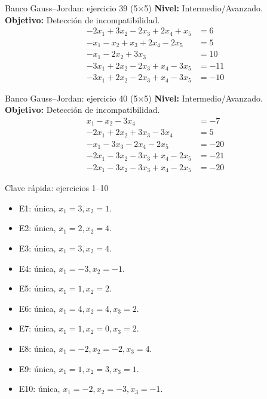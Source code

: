 \documentclass[aspectratio=169,9pt]{beamer}
\theoremstyle{remark}
\begin{document}
\begin{frame}[t]{Banco Gauss--Jordan: ejercicio 39 (5$\times$5)}
\textbf{Nivel:} Intermedio/Avanzado.\\
\textbf{Objetivo:} Detección de incompatibilidad.
\[
\begin{aligned}
- 2 x_{1} + 3 x_{2} - 2 x_{3} + 2 x_{4} + x_{5} &= 6\\
- x_{1} - x_{2} + x_{3} + 2 x_{4} - 2 x_{5} &= 5\\
- x_{1} - 2 x_{2} + 3 x_{3} &= 10\\
- 3 x_{1} + 2 x_{2} - 2 x_{3} + x_{4} - 3 x_{5} &= -11\\
- 3 x_{1} + 2 x_{2} - 2 x_{3} + x_{4} - 3 x_{5} &= -10
\end{aligned}
\]
\end{frame}
\begin{frame}[t]{Banco Gauss--Jordan: ejercicio 40 (5$\times$5)}
\textbf{Nivel:} Intermedio/Avanzado.\\
\textbf{Objetivo:} Detección de incompatibilidad.
\[
\begin{aligned}
x_{1} - x_{2} - 3 x_{4} &= -7\\
- 2 x_{1} + 2 x_{2} + 3 x_{3} - 3 x_{4} &= 5\\
- x_{1} - 3 x_{3} - 2 x_{4} - 2 x_{5} &= -20\\
- 2 x_{1} - 3 x_{2} - 3 x_{3} + x_{4} - 2 x_{5} &= -21\\
- 2 x_{1} - 3 x_{2} - 3 x_{3} + x_{4} - 2 x_{5} &= -20
\end{aligned}
\]
\end{frame}
\begin{frame}[t]{Clave rápida: ejercicios 1--10}\begin{itemize}
\item E1: única, \(x_{1}=3, x_{2}=1\).
\item E2: única, \(x_{1}=2, x_{2}=4\).
\item E3: única, \(x_{1}=3, x_{2}=4\).
\item E4: única, \(x_{1}=-3, x_{2}=-1\).
\item E5: única, \(x_{1}=1, x_{2}=2\).
\item E6: única, \(x_{1}=4, x_{2}=4, x_{3}=2\).
\item E7: única, \(x_{1}=1, x_{2}=0, x_{3}=2\).
\item E8: única, \(x_{1}=-2, x_{2}=-2, x_{3}=4\).
\item E9: única, \(x_{1}=1, x_{2}=3, x_{3}=1\).
\item E10: única, \(x_{1}=-2, x_{2}=-3, x_{3}=-1\).
\end{itemize}\end{frame}
\end{document}
